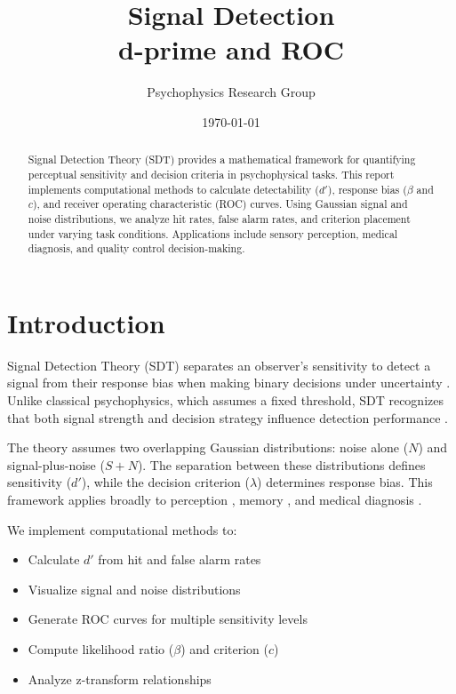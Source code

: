 \documentclass[11pt,a4paper]{article}
\title{Signal Detection\\d-prime and ROC}
\author{Psychophysics Research Group}
\date{\today}
\begin{document}
\maketitle

\begin{abstract}
Signal Detection Theory (SDT) provides a mathematical framework for quantifying perceptual sensitivity and decision criteria in psychophysical tasks. This report implements computational methods to calculate detectability ($d'$), response bias ($\beta$ and $c$), and receiver operating characteristic (ROC) curves. Using Gaussian signal and noise distributions, we analyze hit rates, false alarm rates, and criterion placement under varying task conditions. Applications include sensory perception, medical diagnosis, and quality control decision-making.
\end{abstract}

\section{Introduction}

Signal Detection Theory (SDT) separates an observer's sensitivity to detect a signal from their response bias when making binary decisions under uncertainty \cite{Green1966,Macmillan2005}. Unlike classical psychophysics, which assumes a fixed threshold, SDT recognizes that both signal strength and decision strategy influence detection performance \cite{Swets1961}.

The theory assumes two overlapping Gaussian distributions: noise alone ($N$) and signal-plus-noise ($S+N$). The separation between these distributions defines sensitivity ($d'$), while the decision criterion ($\lambda$) determines response bias. This framework applies broadly to perception \cite{Wickens2002}, memory \cite{Yonelinas2002}, and medical diagnosis \cite{Metz1978}.

We implement computational methods to:
\begin{itemize}
    \item Calculate $d'$ from hit and false alarm rates
    \item Visualize signal and noise distributions
    \item Generate ROC curves for multiple sensitivity levels
    \item Compute likelihood ratio ($\beta$) and criterion ($c$)
    \item Analyze z-transform relationships
\end{itemize}
\end{document}
